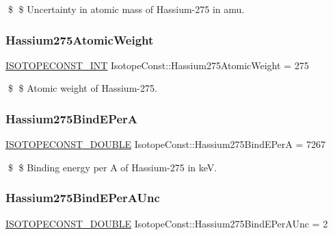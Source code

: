 \$ \$ Uncertainty in atomic mass of Hassium-\/275 in amu. \mbox{\label{group___isotope_const-_hassium-_hs275_gac29aeac3d7fa4743554de7909dbd1afe}} 
\subsubsection{\texorpdfstring{Hassium275\+Atomic\+Weight}{Hassium275AtomicWeight}}
{\footnotesize\ttfamily \mbox{\hyperlink{group___isotope_const-_macros_ga5f18360b3e99483a35c32d789e62621c}{I\+S\+O\+T\+O\+P\+E\+C\+O\+N\+S\+T\+\_\+\+I\+NT}} Isotope\+Const\+::\+Hassium275\+Atomic\+Weight = 275}

\$ \$ Atomic weight of Hassium-\/275. \mbox{\label{group___isotope_const-_hassium-_hs275_ga29e316bbaf77e3df5efebfda145bbf4e}} 
\subsubsection{\texorpdfstring{Hassium275\+Bind\+E\+PerA}{Hassium275BindEPerA}}
{\footnotesize\ttfamily \mbox{\hyperlink{group___isotope_const-_macros_ga8f45a7272ce02c0b4c65c44636ed719a}{I\+S\+O\+T\+O\+P\+E\+C\+O\+N\+S\+T\+\_\+\+D\+O\+U\+B\+LE}} Isotope\+Const\+::\+Hassium275\+Bind\+E\+PerA = 7267}

\$ \$ Binding energy per A of Hassium-\/275 in keV. \mbox{\label{group___isotope_const-_hassium-_hs275_gafac167241debd3c84718033432c350d2}} 
\subsubsection{\texorpdfstring{Hassium275\+Bind\+E\+Per\+A\+Unc}{Hassium275BindEPerAUnc}}
{\footnotesize\ttfamily \mbox{\hyperlink{group___isotope_const-_macros_ga8f45a7272ce02c0b4c65c44636ed719a}{I\+S\+O\+T\+O\+P\+E\+C\+O\+N\+S\+T\+\_\+\+D\+O\+U\+B\+LE}} Isotope\+Const\+::\+Hassium275\+Bind\+E\+Per\+A\+Unc = 2}

